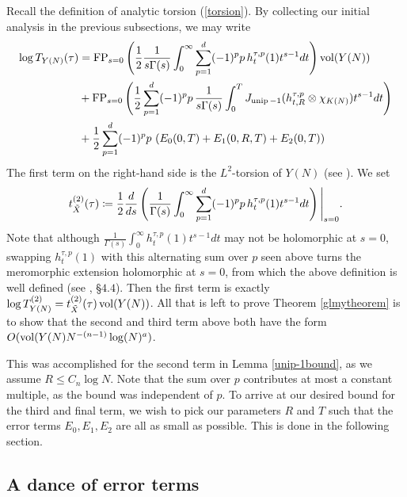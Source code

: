 Recall the definition of analytic torsion (\ref{torsion}). By collecting our initial analysis in the previous subsections, we may write
\begin{align}\label{analbound}
    \log T_{Y(N)}(\tau) &= \operatorname{FP}_{s=0}\left(\frac12\frac{1}{s\Gamma(s)}\int_0^\infty\sum_{p=1}^d (-1)^p p \, h^{\tau,p}_t(1)t^{s-1}dt\right) \operatorname{vol}(Y(N)) \\\label{FPunip-1}
    &+ \operatorname{FP}_{s=0}\left(\frac12\sum_{p=1}^d (-1)^p p\,\frac{1}{s\Gamma(s)} \int_0^T J_{\operatorname{unip}-1}(h^{\tau,p}_{t,R}\otimes\chi_{K(N)})t^{s-1}dt\right) \\
    &+ \frac12\sum_{p=1}^d (-1)^p p\, \left(E_0(0,T) + E_1(0,R,T)+E_2(0,T)\right)
\end{align}
The first term on the right-hand side is the $L^2$-torsion of $Y(N)$ (see \cite{Lott}). We set
\begin{align*}
    t^{(2)}_{\Tilde{X}}(\tau)\coloneqq  \frac12\frac{d}{ds}\left( \frac{1}{\Gamma(s)}\int_0^\infty\sum_{p=1}^d (-1)^p p \, h^{\tau,p}_t(1)t^{s-1}dt\right)\Bigg\vert_{s=0}.
\end{align*}
Note that although $\frac{1}{\Gamma(s)}\int_0^\infty h^{\tau,p}_t(1)t^{s-1}dt$ may not be holomorphic at $s=0$, swapping $h^{\tau,p}_t(1)$ with this alternating sum over $p$ seen above turns the meromorphic extension holomorphic at $s=0$, from which the above definition is well defined (see \cite{BV}, §$4.4$). Then the first term is exactly $\log T^{(2)}_{Y(N)} = t^{(2)}_{\Tilde{X}}(\tau)\operatorname{vol}(Y(N))$. All that is left to prove Theorem \ref{glmytheorem} is to show that the second and third term above both have the form $O(\operatorname{vol}(Y(N)N^{-(n-1)}\log(N)^a)$.

This was accomplished for the second term in Lemma \ref{unip-1bound}, as we assume $R\leq C_n\log N$. Note that the sum over $p$ contributes at most a constant multiple, as the bound was independent of $p$. To arrive at our desired bound for the third and final term, we wish to pick our parameters $R$ and $T$ such that the error terms $E_0,E_1,E_2$ are all as small as possible. This is done in the following section.

\subsection{A dance of error terms}\label{dance}

